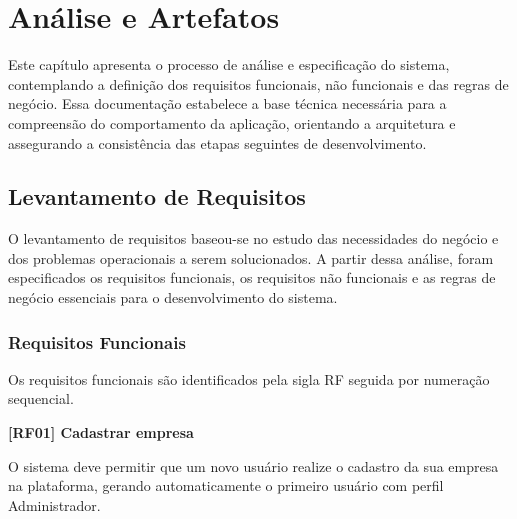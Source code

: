 \chapter{Análise e Artefatos}
\label{Analise}



Este capítulo apresenta o processo de análise e especificação do sistema, contemplando a definição dos requisitos funcionais, não funcionais e das regras de negócio. Essa documentação estabelece a base técnica necessária para a compreensão do comportamento da aplicação, orientando a arquitetura e assegurando a consistência das etapas seguintes de desenvolvimento.

\section{Levantamento de Requisitos}
O levantamento de requisitos baseou-se no estudo das necessidades do negócio e dos problemas operacionais a serem solucionados. A partir dessa análise, foram especificados os requisitos funcionais, os requisitos não funcionais e as regras de negócio essenciais para o desenvolvimento do sistema.

\subsection{Requisitos Funcionais}
Os requisitos funcionais são identificados pela sigla RF seguida por numeração sequencial.

\vspace{\baselineskip}
\noindent\textbf{[RF01] Cadastrar empresa}

O sistema deve permitir que um novo usuário realize o cadastro da sua empresa na plataforma, gerando automaticamente o primeiro usuário com perfil Administrador.

